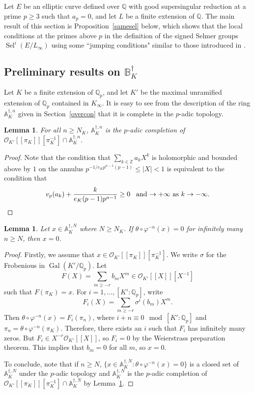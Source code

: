 \documentclass{amsart}
\newcommand{\QQ}{\mathbb Q}
\newcommand{\ZZ}{\mathbb Z}
\newcommand{\BB}{\mathbb B}
\renewcommand{\AA}{\mathbb A}
\DeclareMathOperator{\Sel}{Sel}
\DeclareMathOperator{\Gal}{Gal}
\newcommand{\Qp}{\QQ_p}
\newcommand{\vp}{\varphi}
\newtheorem{lemma}[theorem]{Lemma}
\begin{document}
 Let $E$ be an elliptic curve defined over $\QQ$ with good supersingular reduction at a prime $p\geq 3$ such that $a_p=0$, and let $L$ be a finite extension of $\QQ$. The main result of this section is Proposition~\ref{samesel} below, which shows that the local conditions at the primes above $p$ in the definition of the signed Selmer groups $\Sel^i(E\slash L_\infty)$ using some ``jumping conditions" similar to those introduced in \cite{kobayashi03}.
 
 \subsection{Preliminary results on $\BB^\dagger_K$} 
   
  Let $K$ be a finite extension of $\Qp$, and let $K'$ be the maximal unramified extension of $\Qp$ contained in $K_\infty$. It is easy to see from the description of the ring $\AA^{\dagger,n}_K$ given in Section~\ref{overcon} that it is complete in the $p$-adic topology.
 
  \begin{lemma}\label{completion}
   For all $n\geq N_K$, $\AA^{\dagger,n}_K$ is the $p$-adic completion of $\mathcal{O}_{K'}[\![\pi_K]\!][\pi_K^{-1}]\cap\AA^{\dagger,n}_K$.
  \end{lemma}
  \begin{proof}
   Note that the condition that $\sum_{k\in\ZZ}a_kX^k$ is holomorphic and bounded above by $1$ on the annulus $p^{-1/e_Kp^{n-1}(p-1)}\leq\mid X\mid<1$ is equivalent to the condition that
   \[ v_p(a_k)+\frac{k}{e_K(p-1)p^{n-1}}\geq 0 \hspace{2ex} \text{and $\rightarrow +\infty$ as $k\rightarrow -\infty$}.\]
  \end{proof}

  \begin{lemma}\label{vanish}
   Let $x\in\AA^{\dagger,N}_K$ where $N\ge N_K$. If $\theta\circ\vp^{-n}(x)=0$ for infinitely many $n\ge N$, then $x=0$.
  \end{lemma}
  \begin{proof}
   Firstly, we assume that $x\in\mathcal{O}_{K'}[\![\pi_K]\!][\pi_K^{-1}]$. We write $\sigma$ for the Frobenious in $\Gal(K'/\Qp)$. Let
   \[
   F(X)=\sum_{m\ge -r}b_mX^m\in\mathcal{O}_{K'}[\![X]\!][X^{-1}]
   \]
   such that $F(\pi_K)=x$. For $i=1,\ldots,[K':\Qp]$, write 
   \[ F_i(X)=\sum_{m\ge -r}\sigma^i(b_m)X^m.\]
   Then $\theta\circ\vp^{-n}(x)=F_i(\pi_{n})$, where $i+n\equiv0\mod[K':\Qp]$ and $\pi_n=\theta\circ\vp^{-n}(\pi_K)$. Therefore, there exists an $i$ such that $F_i$ has infinitely many zeros. But $F_i\in X^{-r}\mathcal{O}_{K'}[\![X]\!]$, so $F_i=0$ by the Weierstrass preparation theorem. This implies that $b_m=0$ for all $m$, so $x=0$. 

   To conclude, note that if $n\ge N$, $\{x\in\AA^{\dagger,N}_K:\theta\circ\vp^{-n}(x)=0\}$ is a closed set of $\AA^{\dagger,N}_K$ under the $p$-adic topology and $\AA^{\dagger,N}_K$ is the $p$-adic completion of $\mathcal{O}_{K'}[\![\pi_K]\!][\pi_K^{-1}]\cap\AA^{\dagger,N}_K$ by Lemma~\ref{completion}.
  \end{proof}
\end{document}
